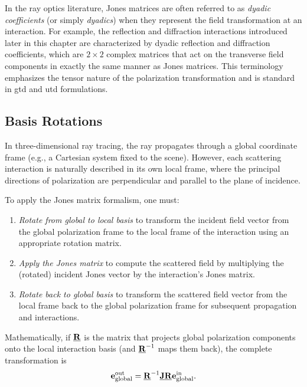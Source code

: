 In the ray optics literature, Jones matrices are often referred to as \emph{dyadic coefficients} (or simply \emph{dyadics}) when they represent the field transformation at an interaction. For example, the reflection and diffraction interactions introduced later in this chapter are characterized by dyadic reflection and diffraction coefficients, which are $2 \times 2$ complex matrices that act on the transverse field components in exactly the same manner as Jones matrices. This terminology emphasizes the tensor nature of the polarization transformation and is standard in \gls{gtd} and \gls{utd} formulations.

\subsection{Basis Rotations}

In three-dimensional ray tracing, the ray propagates through a global coordinate frame (e.g., a Cartesian system fixed to the scene). However, each scattering interaction is naturally described in its own local frame, where the principal directions of polarization are perpendicular and parallel to the plane of incidence.

To apply the Jones matrix formalism, one must:
\begin{enumerate}
  \item \emph{Rotate from global to local basis} to transform the incident field vector from the global polarization frame to the local frame of the interaction using an appropriate rotation matrix.
  \item \emph{Apply the Jones matrix} to compute the scattered field by multiplying the (rotated) incident Jones vector by the interaction's Jones matrix.
  \item \emph{Rotate back to global basis} to transform the scattered field vector from the local frame back to the global polarization frame for subsequent propagation and interactions.
\end{enumerate}

Mathematically, if $\underline{\mathbf{R}}$ is the matrix that projects global polarization components onto the local interaction basis (and $\underline{\mathbf{R}}^{-1}$ maps them back), the complete transformation is
\begin{equation}
  \mathbf{e}^{\text{out}}_{\text{global}} = \underline{\mathbf{R}}^{-1} \underline{\mathbf{J}} \underline{\mathbf{R}} \mathbf{e}^{\text{in}}_{\text{global}}.\label{eq:rotation-jones}
\end{equation}

